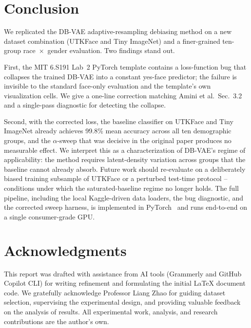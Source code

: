 \documentclass[10pt,twocolumn]{article}
\begin{document}
\section{Conclusion}

We replicated the DB-VAE adaptive-resampling debiasing method on a new
dataset combination (UTKFace and Tiny ImageNet) and a finer-grained
ten-group race~$\times$~gender evaluation. Two findings stand out.

First, the MIT 6.S191 Lab~2 PyTorch template contains a loss-function bug
that collapses the trained DB-VAE into a constant yes-face predictor; the
failure is invisible to the standard face-only evaluation and the
template's own visualization cells. We give a one-line correction matching
Amini et al.\ Sec.~3.2 and a single-pass diagnostic for detecting the
collapse.

Second, with the corrected loss, the baseline classifier on UTKFace and
Tiny ImageNet already achieves 99.8\% mean accuracy across all ten
demographic groups, and the $\alpha$-sweep that was decisive in the
original paper produces no measurable effect. We interpret this as a
characterization of DB-VAE's regime of applicability: the method requires
latent-density variation across groups that the baseline cannot already
absorb. Future work should re-evaluate on a deliberately biased training
subsample of UTKFace or a perturbed test-time protocol -- conditions under which
the saturated-baseline regime no longer holds. The full pipeline,
including the local Kaggle-driven data loaders, the bug diagnostic, and
the corrected sweep harness, is implemented in
PyTorch~\cite{paszke2019pytorch} and runs end-to-end on a single
consumer-grade GPU.

\section*{Acknowledgments}

This report was drafted with assistance from AI tools (Grammerly and GitHub Copilot CLI) for writing refinement and formulating the initial LaTeX document code. We gratefully acknowledge Professor Liang Zhao for guiding dataset selection, supervising the experimental design, and providing valuable feedback on the analysis of results. All experimental work, analysis, and research contributions are the author's own.

{\small


}
\end{document}
